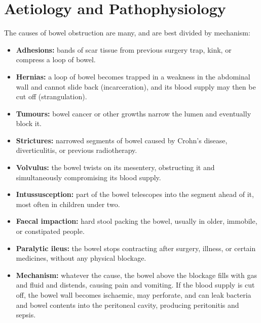 \section*{Aetiology and Pathophysiology}
The causes of bowel obstruction are many, and are best divided by mechanism:
\begin{itemize}
    \item \textbf{Adhesions:} bands of scar tissue from previous surgery trap, kink, or compress a loop of bowel.
    \item \textbf{Hernias:} a loop of bowel becomes trapped in a weakness in the abdominal wall and cannot slide back (incarceration), and its blood supply may then be cut off (strangulation).
    \item \textbf{Tumours:} bowel cancer or other growths narrow the lumen and eventually block it.
    \item \textbf{Strictures:} narrowed segments of bowel caused by Crohn's disease, diverticulitis, or previous radiotherapy.
    \item \textbf{Volvulus:} the bowel twists on its mesentery, obstructing it and simultaneously compromising its blood supply.
    \item \textbf{Intussusception:} part of the bowel telescopes into the segment ahead of it, most often in children under two.
    \item \textbf{Faecal impaction:} hard stool packing the bowel, usually in older, immobile, or constipated people.
    \item \textbf{Paralytic ileus:} the bowel stops contracting after surgery, illness, or certain medicines, without any physical blockage.
    \item \textbf{Mechanism:} whatever the cause, the bowel above the blockage fills with gas and fluid and distends, causing pain and vomiting. If the blood supply is cut off, the bowel wall becomes ischaemic, may perforate, and can leak bacteria and bowel contents into the peritoneal cavity, producing peritonitis and sepsis.
\end{itemize}

